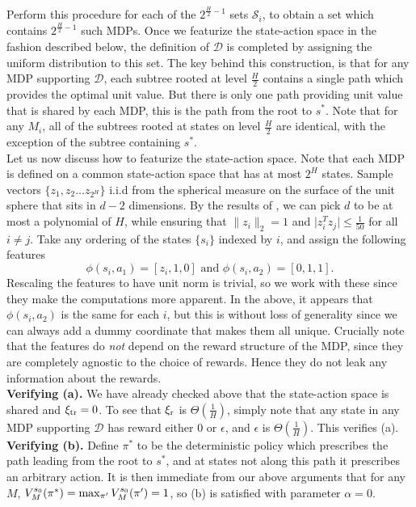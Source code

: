 \documentclass[11pt,twoside]{article}
\begin{document}
\noindent Perform this procedure for each of the $2^{\frac{H}{2} - 1}$ sets $\mathcal{S}_i$, to obtain a set which contains $2^{\frac{H}{2} - 1}$ such MDPs. Once we featurize the state-action space in the fashion described below, the definition of $\mathcal{D}$ is completed by assigning the uniform distribution to this set. The key behind this construction, is that for any MDP supporting $\mathcal{D}$, each subtree rooted at level $\frac{H}{2}$ contains a single path which provides the optimal unit value. But there is only one path providing unit value that is shared by each MDP, this is the path from the root to $s^*$. Note that for any $M_i$, all of the subtrees rooted at states on level $\frac{H}{2}$ are identical, with the exception of the subtree containing $s^*$. \\

Let us now discuss how to featurize the state-action space. Note that each MDP is defined on a common state-action space that has at most $2^H$ states. Sample vectors $\{ z_1, z_2 \dots z_{2^H} \}$ i.i.d from the spherical measure on the surface of the unit sphere that sits in $d-2$ dimensions. By the results of \citep{du20}, we can pick $d$ to be at most a polynomial of $H$, while ensuring that $\| z_i \|_2 = 1$ and $\vert z_i^T z_j \vert \leq \frac{1}{50}$ for all $i \neq j$. Take any ordering of the states $\{ s_i \}$ indexed by $i$, and assign the following features
$$
\phi(s_i, a_1) = [z_i, 1, 0] \text{ and } \phi(s_i, a_2) = [0, 1, 1].
$$
Rescaling the features to have unit norm is trivial, so we work with these since they make the computations more apparent. In the above, it appears that $\phi(s_i, a_2)$ is the same for each $i$, but this is without loss of generality since we can always add a dummy coordinate that makes them all unique. Crucially note that the features do \emph{not} depend on the reward structure of the MDP, since they are completely agnostic to the choice of rewards. Hence they do not leak any information about the rewards. \\

\noindent \textbf{Verifying \weakprox{} (a).} We have already checked above that the state-action space is shared and $\operatorname{\xi_{tr}} = 0$. To see that $\operatorname{\xi_r}$ is $\Theta(\frac{1}{H})$, simply note that any state in any MDP supporting $\mathcal{D}$ has reward either $0$ or $\epsilon$, and $\epsilon$ is $\Theta(\frac{1}{H})$. This verifies \weakprox{} (a). \\

\noindent \textbf{Verifying \weakprox{} (b).} Define $\pi^*$ to be the deterministic policy which prescribes the path leading from the root to $s^*$, and at states not along this path it prescribes an arbitrary action. It is then immediate from our above arguments that for any $M$, $V^{{s_0 }}_{{M }}({\pi^*}) = \max_{\pi'} V^{{s_0 }}_{{M }}({\pi'}) = 1$, so \weakprox{} (b) is satisfied with parameter $\alpha = 0$. \\
\end{document}
